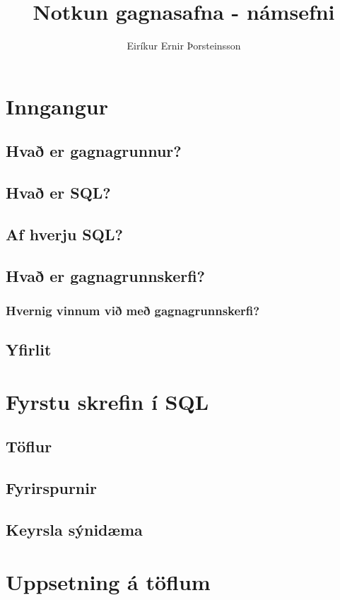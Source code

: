 \documentclass[nohyper,notoc,justified]{tufte-book}
\author{Eiríkur Ernir Þorsteinsson}
\title{Notkun gagnasafna - námsefni}
\date{}
\begin{document}
\setcounter{tocdepth}{2}
\setcounter{secnumdepth}{0}

\maketitle

\tableofcontents

\newpage

\chapter{Inngangur}
\section{Hvað er gagnagrunnur?}
\section{Hvað er SQL?}
\section{Af hverju SQL?}
\section{Hvað er gagnagrunnskerfi?}
\subsection{Hvernig vinnum við með gagnagrunnskerfi?}
\section{Yfirlit}

\chapter{Fyrstu skrefin í SQL}
\section{Töflur}
\section{Fyrirspurnir}
\section{Keyrsla sýnidæma}

\chapter{Uppsetning á töflum}
\end{document}
